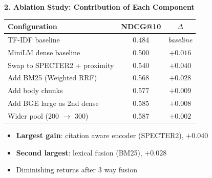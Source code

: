 \documentclass[aspectratio=169, 12pt]{beamer}
\begin{document}
\begin{frame}{\textbf{2. Ablation Study: Contribution of Each Component}}
\centering
\small
\begin{tabular}{lcc}
\toprule
\textbf{Configuration} & \textbf{NDCG@10} & \textbf{$\Delta$} \\
\midrule
TF-IDF baseline                          & 0.484 & \textit{baseline}  \\
MiniLM dense baseline                    & 0.500 & \textcolor{improvement}{$+0.016$} \\
\quad Swap to SPECTER2 + proximity       & 0.540 & \textcolor{improvement}{$+0.040$} \\
\quad Add BM25 (Weighted RRF)            & 0.568 & \textcolor{improvement}{$+0.028$} \\
\quad Add body chunks                    & 0.577 & \textcolor{improvement}{$+0.009$} \\
\quad Add BGE large as 2nd dense         & 0.585 & \textcolor{improvement}{$+0.008$} \\
\quad Wider pool (200 $\to$ 300)         & 0.587 & \textcolor{improvement}{$+0.002$} \\
\bottomrule
\end{tabular}

\vspace{0.8em}
\begin{itemize}
    \item \textbf{Largest gain}: citation aware encoder (SPECTER2), $+0.040$
    \item \textbf{Second largest}: lexical fusion (BM25), $+0.028$
    \item Diminishing returns after 3 way fusion
\end{itemize}
\end{frame}
\end{document}
